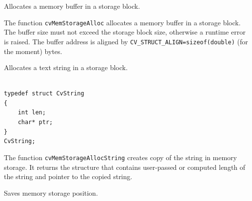 Allocates a memory buffer in a storage block.


\begin{description}
\end{description}

The function \texttt{cvMemStorageAlloc} allocates a memory buffer in
a storage block. The buffer size must not exceed the storage block size,
otherwise a runtime error is raised. The buffer address is aligned by
\texttt{CV\_STRUCT\_ALIGN=sizeof(double)} (for the moment) bytes.

\label{MemStorageAllocString}

Allocates a text string in a storage block.


\begin{lstlisting}

typedef struct CvString
{
    int len;
    char* ptr;
}
CvString;

\end{lstlisting}

\begin{description}
\end{description}

The function \texttt{cvMemStorageAllocString} creates copy of the string
in memory storage. It returns the structure that contains user-passed
or computed length of the string and pointer to the copied string.

\label{SaveMemStoragePos}

Saves memory storage position.


